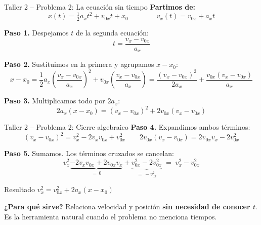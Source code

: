 \documentclass[aspectratio=169,xcolor=dvipsnames]{beamer}
\begin{document}
	
	\begin{frame}{Taller 2 -- Problema 2: La ecuación sin tiempo}
		\small
		\textbf{Partimos de:}
		\[
		x(t) = \tfrac{1}{2}a_x t^2 + v_{0x}t + x_0
		\qquad\qquad
		v_x(t) = v_{0x} + a_x t
		\]
		
		\textbf{Paso 1.} Despejamos $t$ de la segunda ecuación:
		\[
		t = \frac{v_x - v_{0x}}{a_x}
		\]
		
		\textbf{Paso 2.} Sustituimos en la primera y agrupamos $x - x_0$:
		\[
		x - x_0 = \frac{1}{2}a_x\left(\frac{v_x - v_{0x}}{a_x}\right)^{2}
		+ v_{0x}\left(\frac{v_x - v_{0x}}{a_x}\right)
		= \frac{(v_x-v_{0x})^2}{2a_x} + \frac{v_{0x}(v_x-v_{0x})}{a_x}
		\]
		
		\textbf{Paso 3.} Multiplicamos todo por $2a_x$:
		\[
		2a_x(x-x_0) = (v_x-v_{0x})^2 + 2v_{0x}(v_x-v_{0x})
		\]
	\end{frame}
	
	\begin{frame}{Taller 2 -- Problema 2: Cierre algebraico}
		\small
		\textbf{Paso 4.} Expandimos ambos términos:
		\[
		(v_x-v_{0x})^2 = v_x^2 - 2v_xv_{0x} + v_{0x}^2
		\qquad
		2v_{0x}(v_x-v_{0x}) = 2v_{0x}v_x - 2v_{0x}^2
		\]
		
		\textbf{Paso 5.} Sumamos. Los términos cruzados se cancelan:
		\[
		v_x^2 \underbrace{- 2v_xv_{0x} + 2v_{0x}v_x}_{=\,0} + \underbrace{v_{0x}^2 - 2v_{0x}^2}_{=\,-v_{0x}^2}
		\;=\; v_x^2 - v_{0x}^2
		\]
		
		\vspace{0.2cm}
		\begin{exampleblock}{Resultado}
			\centering
			\Large $v_x^2 = v_{0x}^2 + 2a_x(x-x_0)$
		\end{exampleblock}
		
		\vspace{0.2cm}
		\begin{center}
			\small \textbf{¿Para qué sirve?} Relaciona velocidad y posición \textbf{sin necesidad de conocer $t$}.
			Es la herramienta natural cuando el problema no menciona tiempos.
		\end{center}
	\end{frame}
	
	
\end{document}
